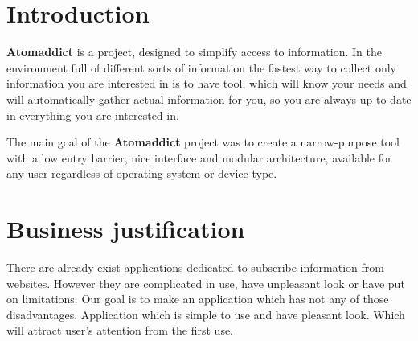 \documentclass[12pt]{article}
\begin{document}
\maketitle

\thispagestyle{empty}
\clearpage
\setcounter{page}{1}

\section{Introduction}
\textbf{Atomaddict} is a project, designed to simplify access to information. In the environment full of different sorts of information the fastest way to collect only information you are interested in is to have tool, which will know your needs and will automatically gather actual information for you, so you are always up-to-date in everything you are interested in.

The main goal of the \textbf{Atomaddict} project was to create a narrow-purpose tool with a low entry barrier, nice interface and modular architecture, available for any user regardless of operating system or device type. 


\section{Business justification}

There are already exist applications dedicated to subscribe information from websites. However they are complicated in use, have unpleasant look or have put on limitations. Our goal is to make an application which has not any of those disadvantages. Application which is simple to use and have pleasant look. Which will attract user's attention from the first use.
\end{document}

